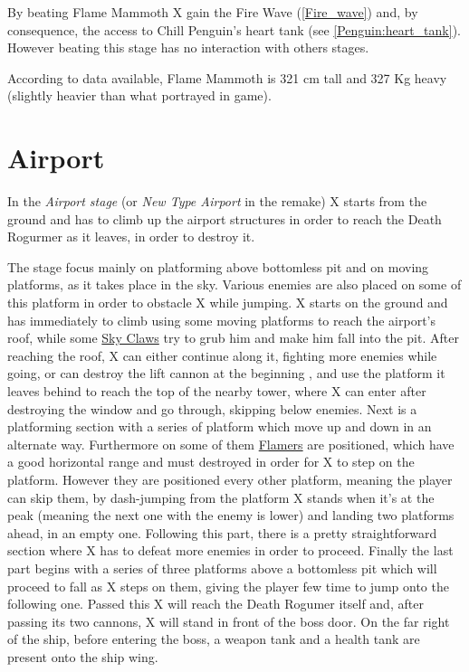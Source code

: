 By beating Flame Mammoth X gain the Fire Wave (\ref{Fire_wave}) and, by consequence, the access to Chill Penguin's heart tank (see \ref{Penguin:heart_tank}). However beating this stage has no interaction with others stages.

According to data available, Flame Mammoth is 321 cm tall and 327 Kg heavy (slightly heavier than what portrayed in game).
\section{Airport}
In the \textit{Airport stage} (or \textit{New Type Airport} in the remake) X starts from the ground and has to climb up the airport structures in order to reach the Death Rogurmer as it leaves, in order to destroy it. 

The stage focus mainly on platforming above bottomless pit and on moving platforms, as it takes place in the sky. Various enemies are also placed on some of this platform in order to obstacle X while jumping. X starts on the ground and has immediately to climb using some moving platforms to reach the airport's roof, while some \hyperlink{enem:Sky_Claw}{Sky Claws} try to grub him and make him fall into the pit. After reaching the roof, X can either continue along it, fighting more enemies while going, or can destroy the lift cannon at the beginning , and use the platform it leaves behind to reach the top of the nearby tower, where X can enter after destroying the window and go through, skipping below enemies. Next is a platforming section with a series of platform which move up and down in an alternate way. Furthermore on some of them \hyperlink{enem:Flamer}{Flamers} are positioned, which have a good horizontal range and must destroyed in order for X to step on the platform. However they are positioned every other platform, meaning the player can skip them, by dash-jumping from the platform X stands when it's at the peak (meaning the next one with the enemy is lower) and landing two platforms ahead, in an empty one. Following this part, there is a pretty straightforward section where X has to defeat more enemies in order to proceed. Finally the last part begins with a series of three platforms above a bottomless pit which will proceed to fall as X steps on them, giving the player few time to jump onto the following one. Passed this X will reach the Death Rogumer itself and, after passing its two cannons, X will stand in front of the boss door. On the far right of the ship, before entering the boss, a weapon tank and a health tank are present onto the ship wing.

